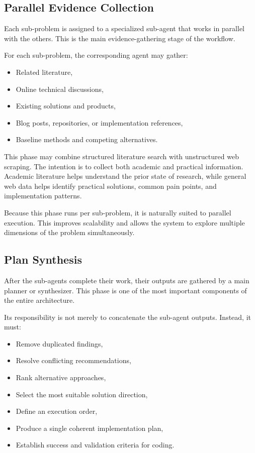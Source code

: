 \documentclass[11pt,a4paper]{article}
\begin{document}
\subsection{Parallel Evidence Collection}

Each sub-problem is assigned to a specialized sub-agent that works in parallel with the others. This is the main evidence-gathering stage of the workflow.

For each sub-problem, the corresponding agent may gather:
\begin{itemize}
    \item Related literature,
    \item Online technical discussions,
    \item Existing solutions and products,
    \item Blog posts, repositories, or implementation references,
    \item Baseline methods and competing alternatives.
\end{itemize}

This phase may combine structured literature search with unstructured web scraping. The intention is to collect both academic and practical information. Academic literature helps understand the prior state of research, while general web data helps identify practical solutions, common pain points, and implementation patterns.

Because this phase runs per sub-problem, it is naturally suited to parallel execution. This improves scalability and allows the system to explore multiple dimensions of the problem simultaneously.

\subsection{Plan Synthesis}

After the sub-agents complete their work, their outputs are gathered by a main planner or synthesizer. This phase is one of the most important components of the entire architecture.

Its responsibility is not merely to concatenate the sub-agent outputs. Instead, it must:
\begin{itemize}
    \item Remove duplicated findings,
    \item Resolve conflicting recommendations,
    \item Rank alternative approaches,
    \item Select the most suitable solution direction,
    \item Define an execution order,
    \item Produce a single coherent implementation plan,
    \item Establish success and validation criteria for coding.
\end{itemize}
\end{document}
